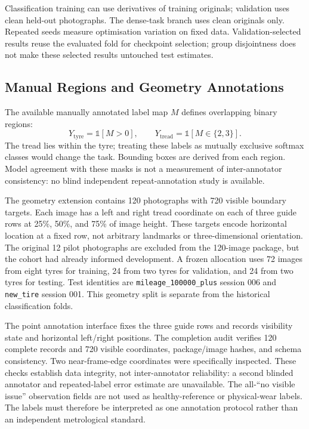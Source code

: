 Classification training can use derivatives of training originals; validation uses clean held-out photographs. The dense-task branch uses clean originals only. Repeated seeds measure optimisation variation on fixed data. Validation-selected results reuse the evaluated fold for checkpoint selection; group disjointness does not make these selected results untouched test estimates.

\subsection{Manual Regions and Geometry Annotations}
The available manually annotated label map $M$ defines overlapping binary regions:
\begin{equation}
Y_{\mathrm{tyre}}=\mathbb{1}[M>0],\qquad
Y_{\mathrm{tread}}=\mathbb{1}[M\in\{2,3\}].
\label{eq:masks}
\end{equation}
The tread lies within the tyre; treating these labels as mutually exclusive softmax classes would change the task. Bounding boxes are derived from each region. Model agreement with these masks is not a measurement of inter-annotator consistency: no blind independent repeat-annotation study is available.

The geometry extension contains 120 photographs with 720 visible boundary targets. Each image has a left and right tread coordinate on each of three guide rows at 25\%, 50\%, and 75\% of image height. These targets encode horizontal location at a fixed row, not arbitrary landmarks or three-dimensional orientation. The original 12 pilot photographs are excluded from the 120-image package, but the cohort had already informed development. A frozen allocation uses 72 images from eight tyres for training, 24 from two tyres for validation, and 24 from two tyres for testing. Test identities are \texttt{mileage\_100000\_plus} session 006 and \texttt{new\_tire} session 001. This geometry split is separate from the historical classification folds.

The point annotation interface fixes the three guide rows and records visibility state and horizontal left/right positions. The completion audit verifies 120 complete records and 720 visible coordinates, package/image hashes, and schema consistency. Two near-frame-edge coordinates were specifically inspected. These checks establish data integrity, not inter-annotator reliability: a second blinded annotator and repeated-label error estimate are unavailable. The all-``no visible issue'' observation fields are not used as healthy-reference or physical-wear labels. The labels must therefore be interpreted as one annotation protocol rather than an independent metrological standard.

